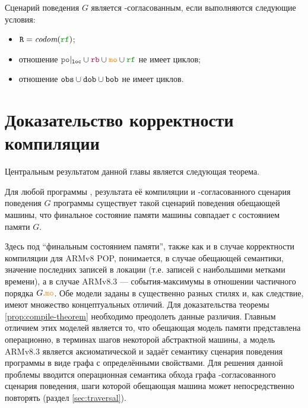 \begin{definition}
Сценарий поведения $G$ является \ARM-согласованным, если выполняются следующие условия:
\begin{itemize}
\item $\lR = \codom{\lRF}$; 
\item отношение $\lPO\rst{\lLOC} \cup \lFR \cup \lCO \cup \lRF$ не имеет циклов; 
\item отношение ${\mathtt{obs}} \cup {\mathtt{dob}} \cup {\mathtt{bob}}$ не имеет циклов. 
\end{itemize}
\end{definition}
\section{Доказательство корректности компиляции}
\label{sec:highlevel}
\noindent
Центральным результатом данной главы является следующая теорема. 
\begin{theorem}
  \label{prop:compile-theorem}
  Для любой программы \Prog, результата её компиляции \ProgARM и \ARM-согласованного
  сценария поведения $G$ программы
  \ProgARM существует такой сценарий поведения обещающей машины, что
  финальное состояние памяти машины совпадает с состоянием памяти $G$.
\end{theorem}
\noindent
Здесь под ``финальным состоянием памяти'', также как и в случае корректности компиляции для
ARMv8 POP, понимается, в случае обещающей семантики, значение последних записей в локации (т.е. записей с наибольшими
метками времени), а в случае ARMv8.3 --- события-максимумы в отношении частичного порядка $G.\lCO$. Обе модели заданы в существенно разных стилях и, как следствие, имеют множество концептуальных отличий. Для доказательства теоремы \ref{prop:compile-theorem} необходимо преодолеть данные различия.
Главным отличием этих моделей является то, что обещающая модель памяти представлена операционно, в терминах
шагов некоторой абстрактной машины, а модель ARMv8.3 является аксиоматической и задаёт семантику 
сценария поведения программы в виде графа с определёнными свойствами. 
Для решения данной проблемы вводится операционная семантика обхода графа \ARM-согласованного
сценария поведения,
шаги которой обещающая машина может непосредственно повторять (раздел \ref{sec:traversal}).
